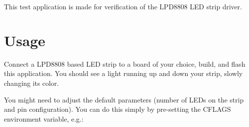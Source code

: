 This test application is made for verification of the L\+P\+D8808 L\+ED strip driver.

\section*{Usage}

Connect a L\+P\+D8808 based L\+ED strip to a board of your choice, build, and flash this application. You should see a light running up and down your strip, slowly changing it\textquotesingle{}s color.

You might need to adjust the default parameters (number of L\+E\+Ds on the strip and pin configuration). You can do this simply by pre-\/setting the {\ttfamily C\+F\+L\+A\+GS} environment variable, e.\+g.\+: 
 